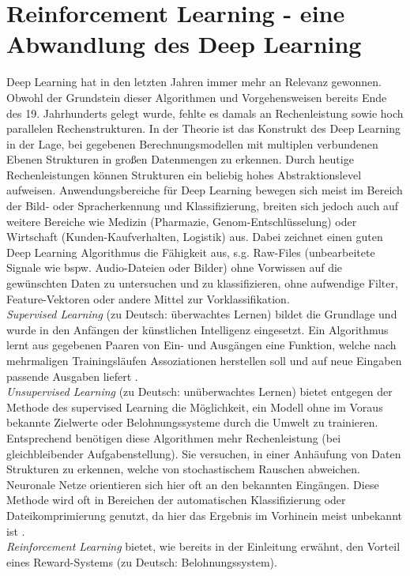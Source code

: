 \section{Reinforcement Learning - eine Abwandlung des Deep Learning}
\label{sec:rl_dl}
	Deep Learning hat in den letzten Jahren immer mehr an Relevanz gewonnen. Obwohl der Grundstein dieser Algorithmen und Vorgehensweisen bereits Ende des 19. Jahrhunderts gelegt wurde, fehlte es damals an Rechenleistung sowie hoch parallelen Rechenstrukturen. In der Theorie ist das Konstrukt des Deep Learning in der Lage, bei gegebenen Berechnungsmodellen mit multiplen verbundenen Ebenen Strukturen in großen Datenmengen zu erkennen. Durch heutige Rechenleistungen können Strukturen ein beliebig hohes Abstraktionslevel aufweisen. Anwendungsbereiche für Deep Learning bewegen sich meist im Bereich der Bild- oder Spracherkennung und Klassifizierung, breiten sich jedoch auch auf weitere Bereiche wie Medizin (Pharmazie, Genom-Entschlüsselung) oder Wirtschaft (Kunden-Kaufverhalten, Logistik) aus. Dabei zeichnet einen guten Deep Learning Algorithmus die Fähigkeit aus, s.g. Raw-Files (unbearbeitete Signale wie bspw. Audio-Dateien oder Bilder) ohne Vorwissen auf die gewünschten Daten zu untersuchen und zu klassifizieren, ohne aufwendige Filter, Feature-Vektoren oder andere Mittel zur Vorklassifikation.\\	
	\textit{Supervised Learning} (zu Deutsch: überwachtes Lernen) bildet die Grundlage und wurde in den Anfängen der künstlichen Intelligenz eingesetzt. Ein Algorithmus lernt aus gegebenen Paaren von Ein- und Ausgängen eine Funktion, welche nach mehrmaligen Trainingsläufen Assoziationen herstellen soll und auf neue Eingaben passende Ausgaben liefert \cite{DeepLearning}.\\
	\textit{Unsupervised Learning} (zu Deutsch: unüberwachtes Lernen) bietet entgegen der Methode des supervised Learning die Möglichkeit, ein Modell ohne im Voraus bekannte Zielwerte oder Belohnungssysteme durch die Umwelt zu trainieren. Entsprechend benötigen diese Algorithmen mehr Rechenleistung (bei gleichbleibender Aufgabenstellung). Sie versuchen, in einer Anhäufung von Daten Strukturen zu erkennen, welche von stochastischem Rauschen abweichen. Neuronale Netze orientieren sich hier oft an den bekannten Eingängen. Diese Methode wird oft in Bereichen der automatischen Klassifizierung oder Dateikomprimierung genutzt, da hier das Ergebnis im Vorhinein meist unbekannt ist \cite{DeepLearning}.\\
	\textit{Reinforcement Learning} bietet, wie bereits in der Einleitung erwähnt, den Vorteil eines Reward-Systems (zu Deutsch: Belohnungssystem).
